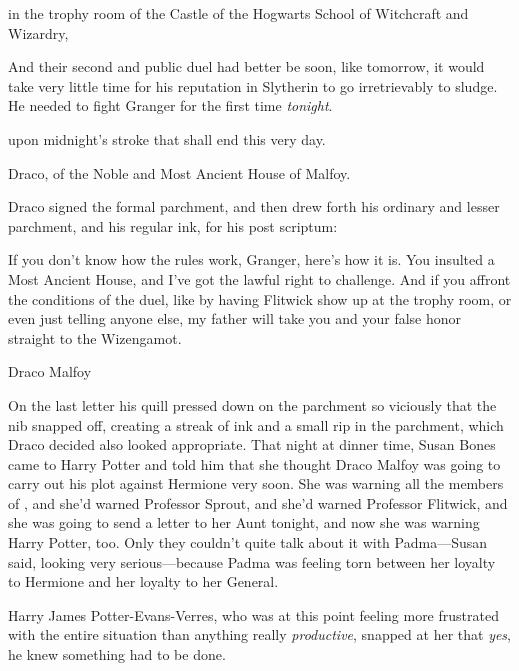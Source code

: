 \begin{writtenNote}
in the trophy room of the Castle of the Hogwarts School of Witchcraft and
Wizardry,
\end{writtenNote}

And their second and public duel had better be soon, like tomorrow, it would
take very little time for his reputation in Slytherin to go irretrievably to
sludge. He needed to fight Granger for the first time \emph{tonight}.

\begin{writtenNote}
upon midnight's stroke that shall end this very day.

Draco, of the Noble and Most Ancient House of Malfoy.
\end{writtenNote}

Draco signed the formal parchment, and then drew forth his ordinary and lesser
parchment, and his regular ink, for his post scriptum:

\begin{writtenNote}
If you don't know how the rules work, Granger, here's how it is. You
insulted a Most Ancient House, and I've got the lawful right to challenge. And
if you affront the conditions of the duel, like by having Flitwick show up at
the trophy room, or even just telling anyone else, my father will take you and
your false honor straight to the Wizengamot.

Draco Malfoy
\end{writtenNote}

On the last letter his quill pressed down on the parchment so viciously that
the nib snapped off, creating a streak of ink and a small rip in the parchment,
which Draco decided also looked appropriate.
\later
That night at dinner time, Susan Bones came to Harry Potter and told him that
she thought Draco Malfoy was going to carry out his plot against Hermione very
soon. She was warning all the members of \SPHEW, and she'd warned Professor
Sprout, and she'd warned Professor Flitwick, and she was going to send a letter
to her Aunt tonight, and now she was warning Harry Potter, too. Only they
couldn't quite talk about it with Padma---Susan said, looking very
serious---because Padma was feeling torn between her loyalty to Hermione and
her loyalty to her General.

Harry James Potter-Evans-Verres, who was at this point feeling more frustrated
with the entire situation than anything really \emph{productive}, snapped at
her that \emph{yes}, he knew something had to be done.

